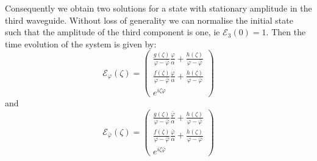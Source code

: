 \documentclass[9pt,twocolumn,twoside]{osajnl}
\begin{document}
Consequently we obtain two solutions for a state with stationary amplitude in the third waveguide.
 Without loss of generality we can normalise the initial state such that the amplitude of the third component is one, ie $\mathcal{E}_3(0)=1$.
 Then the time evolution of the system is given by:
\begin{equation}
\mathcal{E}_{\varphi}(\zeta)=\left( \begin{array}{c}
\frac{g(\zeta)}{\varphi -\bar{\varphi}}\frac{\varphi}{\alpha}+\frac{h(\zeta)}{\varphi -\bar{\varphi}} \\
\frac{f(\zeta)}{\varphi -\bar{\varphi}}\frac{\varphi}{\alpha}+\frac{h(\zeta)}{\varphi -\bar{\varphi}} \\
e^{i\zeta\varphi}
\end{array} \right)	
\end{equation}
and
\begin{equation}
\mathcal{E}_{\bar{\varphi}}(\zeta)=\left( \begin{array}{c}
\frac{g(\zeta)}{\varphi -\bar{\varphi}}\frac{\bar{\varphi}}{\alpha}+\frac{h(\zeta)}{\varphi -\bar{\varphi}} \\
\frac{f(\zeta)}{\varphi -\bar{\varphi}}\frac{\bar{\varphi}}{\alpha}+\frac{h(\zeta)}{\varphi -\bar{\varphi}} \\
e^{i\zeta\bar{\varphi}}
\end{array} \right)	
\end{equation}






\end{document}
